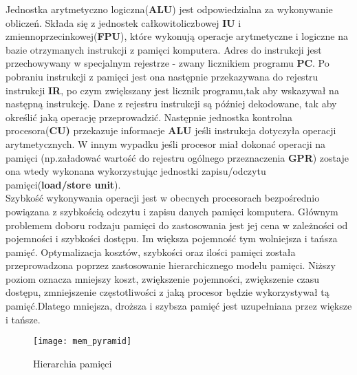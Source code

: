 \documentclass[document.tex]{subfiles}
\begin{document}
Jednostka arytmetyczno logiczna(\textbf{ALU})
jest odpowiedzialna za wykonywanie obliczeń. Składa się z jednostek całkowitoliczbowej \textbf{IU} i zmiennoprzecinkowej(\textbf{FPU}), które wykonują operacje arytmetyczne i logiczne  na bazie otrzymanych instrukcji z pamięci komputera. Adres do instrukcji jest przechowywany w specjalnym rejestrze - zwany licznikiem programu \textbf{PC}. Po pobraniu instrukcji z pamięci jest ona następnie przekazywana do rejestru instrukcji \textbf{IR}, po czym zwiększany jest licznik programu,tak aby wskazywał na następną instrukcję.
Dane z rejestru instrukcji są później dekodowane, tak aby
określić jaką operację przeprowadzić. Następnie jednostka kontrolna procesora(\textbf{CU)} przekazuje informacje \textbf{ALU} jeśli instrukcja dotyczyła operacji arytmetycznych.
W innym wypadku jeśli procesor miał dokonać operacji na pamięci
(np.załadować wartość do rejestru ogólnego przeznaczenia \textbf{GPR}) zostaje ona wtedy wykonana wykorzystując 
jednostki zapisu/odczytu pamięci(\textbf{load/store unit}).
\cite{OS_Stallings}\cite{Inside_Machine}
\\
\indent Szybkość wykonywania operacji jest w obecnych procesorach bezpośrednio powiązana z szybkością odczytu i zapisu danych pamięci komputera. Głównym problemem doboru
rodzaju pamięci do zastosowania jest jej cena w zależności od
pojemności i szybkości dostępu. Im większa pojemność tym wolniejsza i tańsza pamięć. Optymalizacja kosztów, szybkości oraz ilości pamięci została przeprowadzona poprzez zastosowanie
hierarchicznego modelu pamięci. Niższy poziom oznacza mniejszy koszt, zwiększenie pojemności, zwiększenie czasu dostępu, zmniejszenie częstotliwości z jaką procesor będzie wykorzystywał tą pamięć.\cite{Computer_Architecture_Patterson_Hennesy}\cite{OS_Stallings}Dlatego mniejsza, droższa i szybsza pamięć jest uzupełniana przez większe i tańsze.

\begin{figure}[h]
\texttt{[image: mem\_pyramid]}
\caption{Hierarchia pamięci\protect\cite{OS_Stallings}}
\label{fig:mem_pyramid}
\end{figure}
\end{document}
